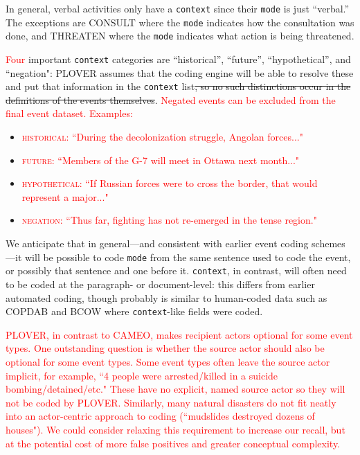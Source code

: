 \documentclass[11pt]{report}
\newcommand{\plcat}[1]{\textsf{#1}}
\newcommand{\andy}[1]{\textcolor{red}{#1}}
\begin{document}
In general, verbal activities only have a \texttt{context} since their \texttt{mode} is just ``verbal.'' The exceptions are \plcat{CONSULT} where the \texttt{mode} indicates how the consultation was done, and \plcat{THREATEN} where the \texttt{mode} indicates what action is being threatened. 

\andy{Four} important \texttt{context} categories are ``historical'', ``future'', ``hypothetical'', and ``negation": PLOVER assumes that the coding engine will be able to resolve these and put that information in the \texttt{context} list\sout{, so no such distinctions occur in the definitions of the events themselves}. \andy{Negated events can be excluded from the final event dataset. Examples:}
   \begin{itemize}
   \item \andy{\textsc{historical}: ``During the decolonization struggle, Angolan forces..."}
   \item \andy{\textsc{future}: ``Members of the G-7 will meet in Ottawa next month..."}
   \item \andy{\textsc{hypothetical}: ``If Russian forces were to cross the border, that would represent a major..."}
   \item \andy{\textsc{negation}: ``Thus far, fighting has not re-emerged in the tense region."	}
   \end{itemize}


We anticipate that in general---and consistent with earlier event coding schemes---it will be possible to code \texttt{mode} from the same sentence used to code the event, or possibly that sentence and one before it. \texttt{context}, in contrast, will often need to be coded at the paragraph- or document-level: this differs from earlier automated coding, though probably is similar to human-coded data such as COPDAB and BCOW where \texttt{context}-like fields were coded.

\andy{PLOVER, in contrast to CAMEO, makes recipient actors optional for some event types. One outstanding question is whether the source actor should also be optional for some event types. Some event types often leave the source actor implicit, for example, ``4 people were arrested/killed in a suicide bombing/detained/etc." These have no explicit, named source actor so they will not be coded by PLOVER. Similarly, many natural disasters do not fit neatly into an actor-centric approach to coding (``mudslides destroyed dozens of houses"). We could consider relaxing this requirement to increase our recall, but at the potential cost of more false positives and greater conceptual complexity.}
\end{document}
